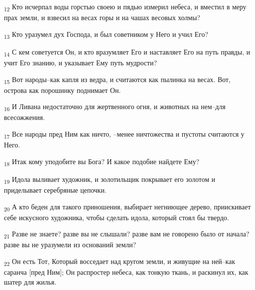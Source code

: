 \begin{tcolorbox}
\textsubscript{12} Кто исчерпал воды горстью своею и пядью измерил небеса, и вместил в меру прах земли, и взвесил на весах горы и на чашах весовых холмы?
\end{tcolorbox}
\begin{tcolorbox}
\textsubscript{13} Кто уразумел дух Господа, и был советником у Него и учил Его?
\end{tcolorbox}
\begin{tcolorbox}
\textsubscript{14} С кем советуется Он, и кто вразумляет Его и наставляет Его на путь правды, и учит Его знанию, и указывает Ему путь мудрости?
\end{tcolorbox}
\begin{tcolorbox}
\textsubscript{15} Вот народы--как капля из ведра, и считаются как пылинка на весах. Вот, острова как порошинку поднимает Он.
\end{tcolorbox}
\begin{tcolorbox}
\textsubscript{16} И Ливана недостаточно для жертвенного огня, и животных на нем--для всесожжения.
\end{tcolorbox}
\begin{tcolorbox}
\textsubscript{17} Все народы пред Ним как ничто, --менее ничтожества и пустоты считаются у Него.
\end{tcolorbox}
\begin{tcolorbox}
\textsubscript{18} Итак кому уподобите вы Бога? И какое подобие найдете Ему?
\end{tcolorbox}
\begin{tcolorbox}
\textsubscript{19} Идола выливает художник, и золотильщик покрывает его золотом и приделывает серебряные цепочки.
\end{tcolorbox}
\begin{tcolorbox}
\textsubscript{20} А кто беден для такого приношения, выбирает негниющее дерево, приискивает себе искусного художника, чтобы сделать идола, который стоял бы твердо.
\end{tcolorbox}
\begin{tcolorbox}
\textsubscript{21} Разве не знаете? разве вы не слышали? разве вам не говорено было от начала? разве вы не уразумели из оснований земли?
\end{tcolorbox}
\begin{tcolorbox}
\textsubscript{22} Он есть Тот, Который восседает над кругом земли, и живущие на ней--как саранча [пред Ним]; Он распростер небеса, как тонкую ткань, и раскинул их, как шатер для жилья.
\end{tcolorbox}
